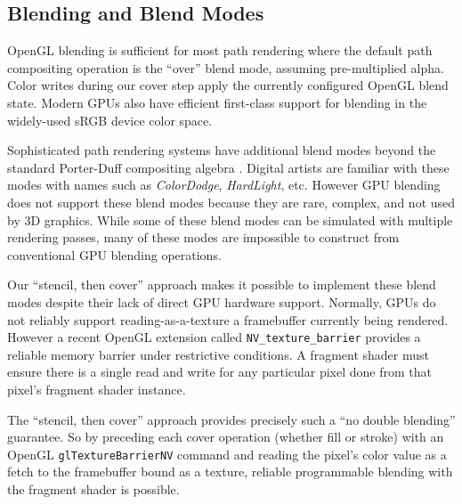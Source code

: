 \subsection{Blending and Blend Modes}

OpenGL blending is sufficient for most path rendering where the
default path compositing operation is the ``over'' blend mode, assuming
pre-multiplied alpha.  Color writes during our cover step apply the
currently configured OpenGL blend state.
Modern GPUs also have efficient first-class support for blending in the
widely-used sRGB device color space.

%

Sophisticated path rendering systems have additional blend modes
\cite{SVG-Compositing-Spec} beyond the standard Porter-Duff compositing
algebra .  Digital artists are
familiar with these modes with names such as {\em ColorDodge}, {\em HardLight}, etc.
However GPU blending does not support these blend modes because they are
rare, complex, and not used by 3D graphics.  While some of these blend
modes can be simulated with multiple rendering passes, many of these modes
are impossible to construct from conventional GPU blending operations.

Our ``stencil, then cover'' approach makes it possible to implement
these blend modes despite their lack of direct GPU hardware support.
Normally, GPUs do not reliably support reading-as-a-texture a framebuffer
currently being rendered.  However a recent OpenGL extension called
{\tt NV\_texture\_barrier} \cite{TextureBarrier} provides a reliable memory
barrier under restrictive conditions.  A fragment shader must ensure
there is a single read and write for any particular pixel done from that
pixel's fragment shader instance.

The ``stencil, then cover'' approach provides precisely such a
``no double blending'' guarantee.  So by preceding each cover operation
(whether fill or stroke) with an OpenGL {\tt glTextureBarrierNV}  command and
reading the pixel's color value as a fetch to the framebuffer bound as
a texture, reliable programmable blending with the fragment shader is
possible.

